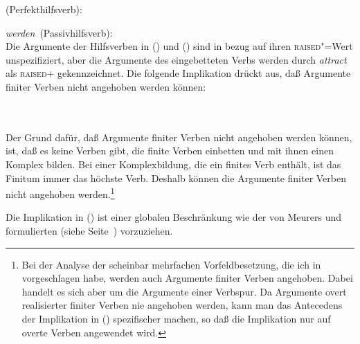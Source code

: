 {\eas
\mbox{\haben (Perfekthilfsverb):}\\
\zs

\eas
\label{le-werden-passive-da-spirits}
\mbox{\emph{werden} (Passivhilfsverb):}\\
\zs
Die Argumente der Hilfsverben in () und () sind in bezug auf ihren \textsc{raised}"=Wert
unspezifiziert, aber die Argumente des eingebetteten Verbs werden durch \emph{attract}
als \textsc{raised}+ gekennzeichnet. Die folgende Implikation drückt aus, daß Argumente finiter
Verben nicht angehoben werden können:

\eas
{} \impl \\\\
\mbox{}\hspace{6em}
\zs
Der Grund dafür, daß Argumente finiter Verben nicht angehoben werden können,
ist, daß es keine Verben gibt, die finite Verben einbetten und mit ihnen einen Komplex bilden.
Bei einer Komplexbildung, die ein finites Verb enthält, ist das Finitum immer das höchste
Verb. Deshalb können die Argumente finiter Verben nicht angehoben werden.\footnote{
  Bei der Analyse der scheinbar mehrfachen Vorfeldbesetzung, die ich in 
  vorgeschlagen habe, werden auch Argumente finiter Verben angehoben. Dabei handelt es sich aber um
  die Argumente einer Verbspur. Da Argumente overt realisierter finiter Verben nie angehoben werden,
  kann man das Antecedens der Implikation in () spezifischer machen, so daß die Implikation
  nur auf overte Verben angewendet wird.%
}

Die Implikation in () ist einer globalen Beschränkung wie der von Meurers und \prz
formulierten (siehe Seite~\pageref{raised-wert}) vorzuziehen.

}
